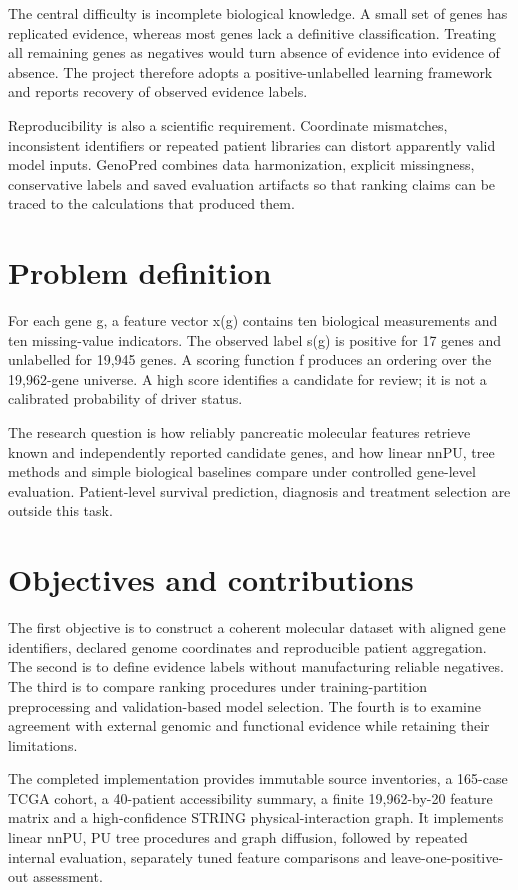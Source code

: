 \documentclass[12pt,a4paper,oneside]{report}
\begin{document}
The central difficulty is incomplete biological knowledge. A small set of genes has replicated evidence, whereas most genes lack a definitive classification. Treating all remaining genes as negatives would turn absence of evidence into evidence of absence. The project therefore adopts a positive-unlabelled learning framework and reports recovery of observed evidence labels.

Reproducibility is also a scientific requirement. Coordinate mismatches, inconsistent identifiers or repeated patient libraries can distort apparently valid model inputs. GenoPred combines data harmonization, explicit missingness, conservative labels and saved evaluation artifacts so that ranking claims can be traced to the calculations that produced them.

\section{Problem definition}
For each gene g, a feature vector x(g) contains ten biological measurements and ten missing-value indicators. The observed label s(g) is positive for 17 genes and unlabelled for 19,945 genes. A scoring function f produces an ordering over the 19,962-gene universe. A high score identifies a candidate for review; it is not a calibrated probability of driver status.

The research question is how reliably pancreatic molecular features retrieve known and independently reported candidate genes, and how linear nnPU, tree methods and simple biological baselines compare under controlled gene-level evaluation. Patient-level survival prediction, diagnosis and treatment selection are outside this task.

\section{Objectives and contributions}
The first objective is to construct a coherent molecular dataset with aligned gene identifiers, declared genome coordinates and reproducible patient aggregation. The second is to define evidence labels without manufacturing reliable negatives. The third is to compare ranking procedures under training-partition preprocessing and validation-based model selection. The fourth is to examine agreement with external genomic and functional evidence while retaining their limitations.

The completed implementation provides immutable source inventories, a 165-case TCGA cohort, a 40-patient accessibility summary, a finite 19,962-by-20 feature matrix and a high-confidence STRING physical-interaction graph. It implements linear nnPU, PU tree procedures and graph diffusion, followed by repeated internal evaluation, separately tuned feature comparisons and leave-one-positive-out assessment.
\end{document}
